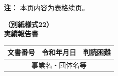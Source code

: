 \documentclass[UTF8,10pt,a4paper,fontset=fandol]{ctexart}
\newcommand{\fieldvalue}[1]{#1}
\newcommand{\handwritten}[1]{#1}
\begin{document}
\noindent
\textbf{注：} 本页内容为表格续页。

\newpage

\begin{center}
\textbf{（別紙様式22）}\\[2pt]
\textbf{実績報告書}
\end{center}

\begin{tabularx}{\textwidth}{|l|X|r|}
\hline
文書番号 & \centering 令和\underline{\hspace{1.2cm}}年\underline{\hspace{1.2cm}}月\underline{\hspace{1.2cm}}日 &
\begin{minipage}{0.18\textwidth}
\fieldvalue{\handwritten{判読困難}}
\end{minipage}
\\
\hline
\multicolumn{3}{|c|}{事業名・団体名等}\\
\hline
\end{tabularx}

\vspace{0.5em}
\end{document}
